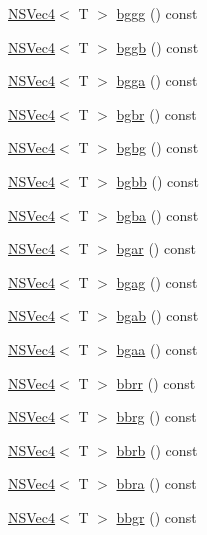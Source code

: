 \begin{DoxyCompactItemize}
\item 
\hyperlink{structNSVec4}{N\-S\-Vec4}$<$ T $>$ \hyperlink{structNSVec4_a5f4b7db2b88d49ba9aec9b5fbecce071}{bggg} () const 
\item 
\hyperlink{structNSVec4}{N\-S\-Vec4}$<$ T $>$ \hyperlink{structNSVec4_ad56a87702ad3fd38d313ea2d0f481688}{bggb} () const 
\item 
\hyperlink{structNSVec4}{N\-S\-Vec4}$<$ T $>$ \hyperlink{structNSVec4_a201138364d4f84929d41b659829d44f8}{bgga} () const 
\item 
\hyperlink{structNSVec4}{N\-S\-Vec4}$<$ T $>$ \hyperlink{structNSVec4_a72ef9ee149e59cd9ac0a9d4eef0fc029}{bgbr} () const 
\item 
\hyperlink{structNSVec4}{N\-S\-Vec4}$<$ T $>$ \hyperlink{structNSVec4_abbf87b5099f135f592f5e7aceef06b7b}{bgbg} () const 
\item 
\hyperlink{structNSVec4}{N\-S\-Vec4}$<$ T $>$ \hyperlink{structNSVec4_abed1e666326ed8072fcd1299568a4257}{bgbb} () const 
\item 
\hyperlink{structNSVec4}{N\-S\-Vec4}$<$ T $>$ \hyperlink{structNSVec4_afeb522a36d60bcd0edbe932b9254186d}{bgba} () const 
\item 
\hyperlink{structNSVec4}{N\-S\-Vec4}$<$ T $>$ \hyperlink{structNSVec4_a38f8f9dbf176dd58716270fde02996d5}{bgar} () const 
\item 
\hyperlink{structNSVec4}{N\-S\-Vec4}$<$ T $>$ \hyperlink{structNSVec4_aa43620ac8147cd7642d79818b2e26d60}{bgag} () const 
\item 
\hyperlink{structNSVec4}{N\-S\-Vec4}$<$ T $>$ \hyperlink{structNSVec4_a85ba2c34b2157cb8c48c5d958a25a7b0}{bgab} () const 
\item 
\hyperlink{structNSVec4}{N\-S\-Vec4}$<$ T $>$ \hyperlink{structNSVec4_a367f8bef13ed1a17f596c4f46491cb4b}{bgaa} () const 
\item 
\hyperlink{structNSVec4}{N\-S\-Vec4}$<$ T $>$ \hyperlink{structNSVec4_a784f2c39e43fcfb87badbe82b48ab4e3}{bbrr} () const 
\item 
\hyperlink{structNSVec4}{N\-S\-Vec4}$<$ T $>$ \hyperlink{structNSVec4_ac2c84c928f5dcd1dd588b9efb653ae9b}{bbrg} () const 
\item 
\hyperlink{structNSVec4}{N\-S\-Vec4}$<$ T $>$ \hyperlink{structNSVec4_a82989439359c350d5666e1b044f7f12d}{bbrb} () const 
\item 
\hyperlink{structNSVec4}{N\-S\-Vec4}$<$ T $>$ \hyperlink{structNSVec4_a0b9047eb90b7f9e799131f8e1e8f30e6}{bbra} () const 
\item 
\hyperlink{structNSVec4}{N\-S\-Vec4}$<$ T $>$ \hyperlink{structNSVec4_ac5692ac92ac8a69b06096ef987062123}{bbgr} () const 

\end{DoxyCompactItemize}
